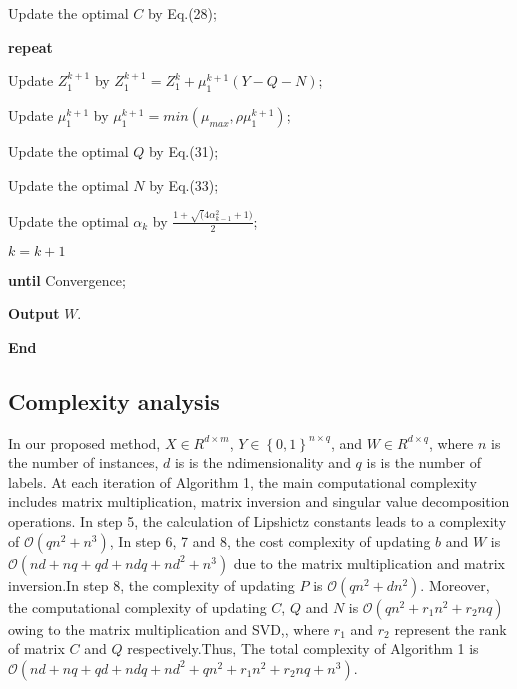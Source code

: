 \documentclass[final,3p,times]{elsarticle}
\begin{document}
\begin{algorithm}[htp]
\begin{algorithmic}[1]
\STATE Update the optimal $C$  by Eq.(28);

\STATE \qquad\textbf{repeat}

\STATE \qquad\quad Update $ Z_1^{k+1}$ by $ Z_1^{k+1}=Z_1^{k}+\mu_{1}^{k+1}(Y-Q-N)$;

\STATE \qquad\quad Update $ \mu_1^{k+1}$ by $ \mu_1^{k+1}=min(\mu_{max},\rho\mu_{1}^{k+1})$;

\STATE Update the optimal $Q$  by Eq.(31);

\STATE Update the optimal $N$  by Eq.(33);

\STATE Update the optimal $\alpha_{k}$  by $\frac{1+\sqrt(4\alpha_{k-1}^2+1)}{2}$;

\STATE  $k=k+1$  

\STATE \textbf{until} Convergence;

\STATE \textbf{Output} $W$.

\STATE \textbf{End}
\end{algorithmic}

\end{algorithm}



\subsection{Complexity analysis}


In our proposed method, $X \in R^{d \times m}$, $Y \in \left\{ 0, 1 \right\}^{n \times q}$, and $W \in R^{d \times q}$, where $n$ is the number of instances, $d$ is is the ndimensionality and $q$ is is the number of labels. At each iteration of Algorithm 1, the main computational complexity includes matrix multiplication, matrix inversion and singular value decomposition operations. In step 5, the calculation of Lipshictz constants leads to a complexity of $\mathcal{O}\left( qn^2+n^3\right) $, In step 6, 7 and 8, the cost complexity of updating $b$ and $W$  is $\mathcal{O}\left( nd+nq+qd+ndq+nd^2+n^3\right) $ due to the matrix multiplication and matrix inversion.In step 8, the complexity of updating $P$ is $\mathcal{O}\left( qn^2+dn^2\right) $.  Moreover, the computational complexity of updating $C$, $Q$ and $N$ is $\mathcal{O}\left( qn^2+r_1n^2+r_2nq\right) $ owing to the matrix multiplication and SVD,, where $r_1$ and $r_2$ represent the rank of matrix $C$ and $Q$ respectively.Thus, The total complexity of Algorithm 1 is $\mathcal{O}\left( nd+nq+qd+ndq+nd^2+qn^2+r_1n^2+r_2nq+n^3\right) $.
\end{document}

